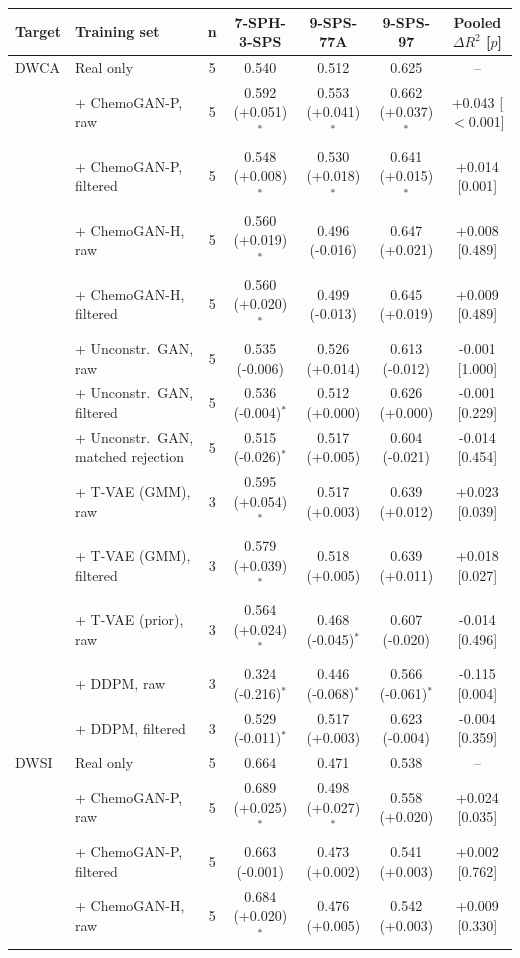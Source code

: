 \begin{tabular}{llccccc}
\hline
\textbf{Target} & \textbf{Training set} & \textbf{n} & \textbf{7-SPH-3-SPS} & \textbf{9-SPS-77A} & \textbf{9-SPS-97} & \textbf{Pooled $\Delta R^2$ [$p$]} \\ \hline
DWCA & Real only & 5 & 0.540 & 0.512 & 0.625 & -- \\
 & + ChemoGAN-P, raw & 5 & 0.592 (+0.051)$^{*}$ & 0.553 (+0.041)$^{*}$ & 0.662 (+0.037)$^{*}$ & +0.043 [$<$0.001] \\
 & + ChemoGAN-P, filtered & 5 & 0.548 (+0.008)$^{*}$ & 0.530 (+0.018)$^{*}$ & 0.641 (+0.015)$^{*}$ & +0.014 [0.001] \\
 & + ChemoGAN-H, raw & 5 & 0.560 (+0.019)$^{*}$ & 0.496 (-0.016) & 0.647 (+0.021) & +0.008 [0.489] \\
 & + ChemoGAN-H, filtered & 5 & 0.560 (+0.020)$^{*}$ & 0.499 (-0.013) & 0.645 (+0.019) & +0.009 [0.489] \\
 & + Unconstr.\ GAN, raw & 5 & 0.535 (-0.006) & 0.526 (+0.014) & 0.613 (-0.012) & -0.001 [1.000] \\
 & + Unconstr.\ GAN, filtered & 5 & 0.536 (-0.004)$^{*}$ & 0.512 (+0.000) & 0.626 (+0.000) & -0.001 [0.229] \\
 & + Unconstr.\ GAN, matched rejection & 5 & 0.515 (-0.026)$^{*}$ & 0.517 (+0.005) & 0.604 (-0.021) & -0.014 [0.454] \\
 & + T-VAE (GMM), raw & 3 & 0.595 (+0.054)$^{*}$ & 0.517 (+0.003) & 0.639 (+0.012) & +0.023 [0.039] \\
 & + T-VAE (GMM), filtered & 3 & 0.579 (+0.039)$^{*}$ & 0.518 (+0.005) & 0.639 (+0.011) & +0.018 [0.027] \\
 & + T-VAE (prior), raw & 3 & 0.564 (+0.024)$^{*}$ & 0.468 (-0.045)$^{*}$ & 0.607 (-0.020) & -0.014 [0.496] \\
 & + DDPM, raw & 3 & 0.324 (-0.216)$^{*}$ & 0.446 (-0.068)$^{*}$ & 0.566 (-0.061)$^{*}$ & -0.115 [0.004] \\
 & + DDPM, filtered & 3 & 0.529 (-0.011)$^{*}$ & 0.517 (+0.003) & 0.623 (-0.004) & -0.004 [0.359] \\
\hline
DWSI & Real only & 5 & 0.664 & 0.471 & 0.538 & -- \\
 & + ChemoGAN-P, raw & 5 & 0.689 (+0.025)$^{*}$ & 0.498 (+0.027)$^{*}$ & 0.558 (+0.020) & +0.024 [0.035] \\
 & + ChemoGAN-P, filtered & 5 & 0.663 (-0.001) & 0.473 (+0.002) & 0.541 (+0.003) & +0.002 [0.762] \\
 & + ChemoGAN-H, raw & 5 & 0.684 (+0.020)$^{*}$ & 0.476 (+0.005) & 0.542 (+0.003) & +0.009 [0.330] \\

\end{tabular}

